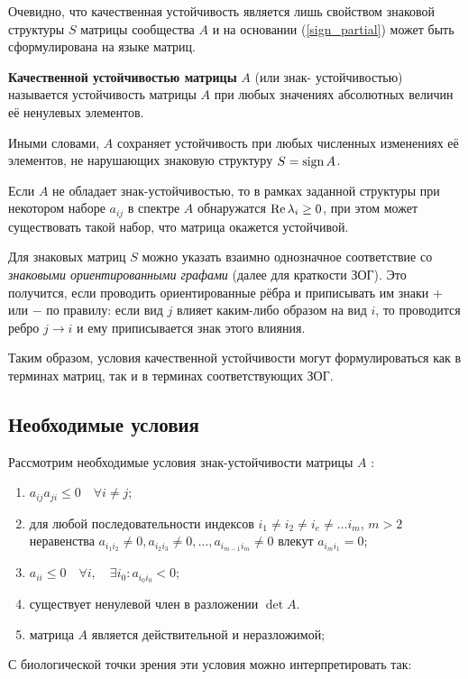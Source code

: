     Очевидно, что качественная устойчивость является лишь свойством знаковой структуры \(S\) матрицы сообщества \(A\) и на основании (\ref{sign_partial}) может быть сформулирована на языке матриц.
    \begin{definition}
        \textbf{Качественной устойчивостью матрицы} \(A\) (или знак- \hspace{-2pt}устойчивостью) называется устойчивость матрицы \(A\) при любых значениях абсолютных величин её ненулевых элементов.
    \end{definition}
    Иными словами, \(A\) сохраняет устойчивость при любых численных изменениях её элементов, не нарушающих знаковую структуру \(S = \operatorname{sign} A\).

    Если \(A\) не обладает знак-устойчивостью, то в рамках заданной структуры при некотором наборе \({a_{ij}}\) в спектре \(A\) обнаружатся \(\operatorname{Re} \lambda_i \geq 0\), при этом может существовать такой набор, что матрица окажется устойчивой.

    Для знаковых матриц \(S\) можно указать взаимно однозначное соответствие со \textit{знаковыми ориентированными графами} (далее для краткости ЗОГ). Это получится, если проводить ориентированные рёбра и приписывать им знаки \(+\) или \(-\) по правилу: если вид \(j\) влияет каким-либо образом на вид \(i\), то проводится ребро \(j \to i\) и ему приписывается знак этого влияния.

    Таким образом, условия качественной устойчивости могут формулироваться как в терминах матриц, так и в терминах соответствующих ЗОГ.

\subsection{Необходимые условия}

    Рассмотрим необходимые условия знак-устойчивости матрицы \(A\) \cite{quirk_rupert}:
    \begin{enumerate}
        \item \(a_{ij} a_{ji} \leq 0 \quad \forall i \neq j\); \label{sign_nes_1}
        \item для любой последовательности индексов \(i_1 \neq i_2 \neq i_e \neq \dots i_m \), \(m > 2\) неравенства \(a_{i_1 i_2} \neq 0, a_{i_2 i_3} \neq 0, \dots, a_{i_{m-1} i_m} \neq 0\) влекут \(a_{i_m i_1} = 0\); \label{sign_nes_2}
        \item \(a_{ii} \leq 0 \quad \forall i, \quad \exists i_0 : a_{i_0 i_0} < 0\); \label{sign_nes_3}
        \item существует ненулевой член в разложении \(\det A\). \label{sign_nes_4}
        \item матрица \(A\) является действительной и неразложимой; \label{sign_nes_neraz}
    \end{enumerate}
    С биологической точки зрения эти условия можно интерпретировать так:
    
